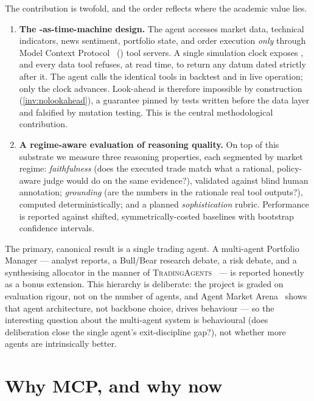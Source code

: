 The contribution is twofold, and the order reflects where the academic value lies.

\begin{enumerate}
  \item \textbf{The \mcp-as-time-machine design.} The agent accesses market data, technical
  indicators, news sentiment, portfolio state, and order execution \emph{only} through Model
  Context Protocol~\cite{mcp2024} (\mcp) tool servers. A single simulation clock exposes
  \tnow, and every data tool refuses, at read time, to return any datum dated strictly after
  it. The agent calls the identical tools in backtest and in live operation; only the clock
  advances. Look-ahead is therefore impossible by construction (\cref{inv:nolookahead}), a
  guarantee pinned by tests written before the data layer and falsified by mutation testing.
  This is the central methodological contribution.
  \item \textbf{A regime-aware evaluation of reasoning quality.} On top of this substrate we
  measure three reasoning properties, each segmented by market regime: \emph{faithfulness}
  (does the executed trade match what a rational, policy-aware judge would do on the same
  evidence?), validated against blind human annotation; \emph{grounding} (are the numbers in
  the rationale real tool outputs?), computed deterministically; and a planned
  \emph{sophistication} rubric. Performance is reported against shifted, symmetrically-costed
  baselines with bootstrap confidence intervals.
\end{enumerate}

The primary, canonical result is a single trading agent. A multi-agent Portfolio Manager
--- analyst reports, a Bull/Bear research debate, a risk debate, and a synthesising allocator
in the manner of \textsc{TradingAgents}~\cite{tradingagents2024} --- is reported honestly as
a bonus extension. This hierarchy is deliberate: the project is graded on evaluation rigour,
not on the number of agents, and Agent Market Arena~\cite{ama2025} shows that agent
architecture, not backbone choice, drives behaviour --- so the interesting question about the
multi-agent system is behavioural (does deliberation close the single agent's
exit-discipline gap?), not whether more agents are intrinsically better.

\section{Why MCP, and why now}

